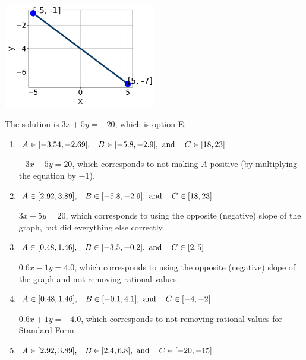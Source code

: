 \documentclass{extbook}[14pt]
\begin{document}
\begin{enumerate}
{\begin{center}
    \includegraphics[width=0.5\textwidth]{../Figures/linearGraphToStandardC.png}
\end{center}


The solution is \( 3x + 5y = -20 \), which is option E.\begin{enumerate}[label=\Alph*.]
\item \( A \in [-3.54, -2.69], \hspace{3mm} B \in [-5.8, -2.9], \text{ and } \hspace{3mm} C \in [18, 23] \)

 $-3x - 5y = 20$, which corresponds to not making $A$ positive (by multiplying the equation by $-1$).
\item \( A \in [2.92, 3.89], \hspace{3mm} B \in [-5.8, -2.9], \text{ and } \hspace{3mm} C \in [18, 23] \)

 $3x - 5y = 20$, which corresponds to using the opposite (negative) slope of the graph, but did everything else correctly.
\item \( A \in [0.48, 1.46], \hspace{3mm} B \in [-3.5, -0.2], \text{ and } \hspace{3mm} C \in [2, 5] \)

 $0.6x - 1y = 4.0$, which corresponds to using the opposite (negative) slope of the graph and not removing rational values.
\item \( A \in [0.48, 1.46], \hspace{3mm} B \in [-0.1, 4.1], \text{ and } \hspace{3mm} C \in [-4, -2] \)

 $0.6x + 1y = -4.0$, which corresponds to not removing rational values for Standard Form.
\item \( A \in [2.92, 3.89], \hspace{3mm} B \in [2.4, 6.8], \text{ and } \hspace{3mm} C \in [-20, -15] \)


\end{enumerate}}
\end{enumerate}
\end{document}
